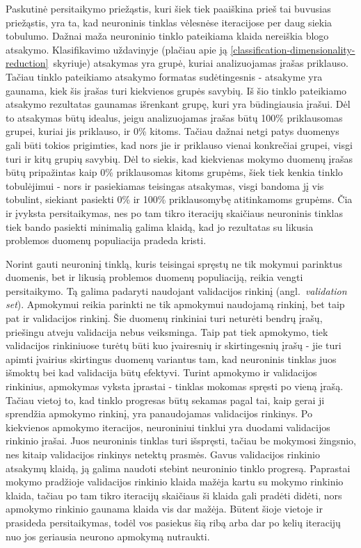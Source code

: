 \documentclass{VUMIFPSbakalaurinis}
\begin{document}
Paskutinė persitaikymo priežąstis, kuri šiek tiek paaiškina prieš tai buvusias priežąstis, yra ta, kad neuroninis tinklas vėlesnėse iteracijose per daug siekia tobulumo.
Dažnai maža neuroninio tinklo pateikiama klaida nereiškia blogo atsakymo.
Klasifikavimo uždavinyje (plačiau apie ją \ref{classification-dimensionality-reduction}~skyriuje) atsakymas yra grupė, kuriai analizuojamas įrašas priklauso.
Tačiau tinklo pateikiamo atsakymo formatas sudėtingesnis - atsakyme yra gaunama, kiek šis įrašas turi kiekvienos grupės savybių.
Iš šio tinklo pateikiamo atsakymo rezultatas gaunamas išrenkant grupę, kuri yra būdingiausia įrašui.
Dėl to atsakymas būtų idealus, jeigu analizuojamas įrašas būtų 100\% priklausomas grupei, kuriai jis priklauso, ir 0\% kitoms.
Tačiau dažnai netgi patys duomenys gali būti tokios prigimties, kad nors jie ir priklauso vienai konkrečiai grupei, visgi turi ir kitų grupių savybių.
Dėl to siekis, kad kiekvienas mokymo duomenų įrašas būtų pripažintas kaip 0\% priklausomas kitoms grupėms, šiek tiek kenkia tinklo tobulėjimui - nors ir pasiekiamas teisingas atsakymas, visgi bandoma jį vis tobulint, siekiant pasiekti 0\% ir 100\% priklausomybę atitinkamoms grupėms.
Čia ir įvyksta persitaikymas, nes po tam tikro iteracijų skaičiaus neuroninis tinklas tiek bando pasiekti minimalią galima klaidą, kad jo rezultatas su likusia problemos duomenų populiacija pradeda kristi.

Norint gauti neuroninį tinklą, kuris teisingai spręstų ne tik mokymui parinktus duomenis, bet ir likusią problemos duomenų populiaciją, reikia vengti persitaikymo.
Tą galima padaryti naudojant validacijos rinkinį (angl.~\textit{validation set}).
Apmokymui reikia parinkti ne tik apmokymui naudojamą rinkinį, bet taip pat ir validacijos rinkinį.
Šie duomenų rinkiniai turi neturėti bendrų įrašų, priešingu atveju validacija nebus veiksminga.
Taip pat tiek apmokymo, tiek validacijos rinkiniuose turėtų būti kuo įvairesnių ir skirtingesnių įrašų - jie turi apimti įvairius skirtingus duomenų variantus tam, kad neuroninis tinklas juos išmoktų bei kad validacija būtų efektyvi.
Turint apmokymo ir validacijos rinkinius, apmokymas vyksta įprastai - tinklas mokomas spręsti po vieną įrašą.
Tačiau vietoj to, kad tinklo progresas būtų sekamas pagal tai, kaip gerai ji sprendžia apmokymo rinkinį, yra panaudojamas validacijos rinkinys.
Po kiekvienos apmokymo iteracijos, neuroniniui tinklui yra duodami validacijos rinkinio įrašai.
Juos neuroninis tinklas turi išspręsti, tačiau be mokymosi žingsnio, nes kitaip validacijos rinkinys netektų prasmės.
Gavus validacijos rinkinio atsakymų klaidą, ją galima naudoti stebint neuroninio tinklo progresą.
Paprastai mokymo pradžioje validacijos rinkinio klaida mažėja kartu su mokymo rinkinio klaida, tačiau po tam tikro iteracijų skaičiaus ši klaida gali pradėti didėti, nors apmokymo rinkinio gaunama klaida vis dar mažėja.
Būtent šioje vietoje ir prasideda persitaikymas, todėl vos pasiekus šią ribą arba dar po kelių iteracijų nuo jos geriausia neurono apmokymą nutraukti.
\end{document}
